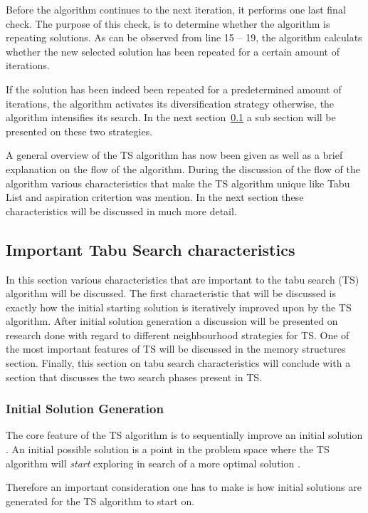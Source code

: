 Before the algorithm continues to the next iteration, it performs one last final check. The purpose of this check, is to determine whether the algorithm is repeating solutions. As can be observed from line 15 -- 19, the algorithm calculats whether the new selected solution has been repeated for a certain amount of iterations. 

If the solution has been indeed been repeated for a predetermined amount of iterations, the algorithm activates its diversification strategy otherwise, the algorithm intensifies its search. In the next section~\ref{sec:TScharacteristics} a sub section will be presented on these two strategies.

A general overview of the TS algorithm has now been given as well as a brief explanation on the flow of the algorithm. During the discussion of the flow of the algorithm various characteristics that make the TS algorithm unique like Tabu List and aspiration critertion was mention. In the next section these characteristics will be discussed in much more detail.

\subsection{Important Tabu Search characteristics}
\label{sec:TScharacteristics}
In this section various characteristics that are important to the tabu search (TS) algorithm will be discussed. The first characteristic that will be discussed is exactly how the initial starting solution is iteratively improved upon by the TS algorithm. After initial solution generation a discussion will be presented on research done with regard to different neighbourhood strategies for TS. One of the most important features of TS will be discussed in the memory structures section. Finally, this section on tabu search characteristics will conclude with a section that discusses the two search phases present in TS.

\subsubsection{Initial Solution Generation}
The core feature of the TS algorithm is to sequentially improve an initial solution \cite{TSHazardous}. An initial possible solution is a point in the problem space where the TS algorithm will \emph{start} exploring in search of a more optimal solution \cite{AIModernApproach,TSHazardous}.

Therefore an important consideration one has to make is how initial solutions are generated for the TS algorithm to start on\cite{AIModernApproach,TSHazardous}.

